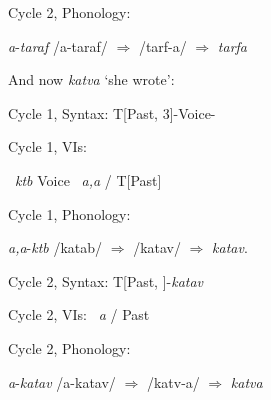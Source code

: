 \begin{exe}
\begin{xlist}
\begin{exe}
\begin{xlist}
\begin{exe}
\begin{xlist}
\begin{exe}
\begin{exe}
\begin{xlist}
\begin{exe}
\begin{xlist}
\begin{exe}
\begin{xlist}
\begin{exe}
\begin{xlist}
\begin{exe}
\begin{xlist}
\begin{exe}
\begin{xlist}
\begin{exe}
\begin{xlist}
\begin{exe}
\begin{xlist}
\begin{exe}
\begin{xlist}
\begin{exe}
\begin{xlist}
\begin{exe}
\begin{xlist}
\begin{exe}
\begin{xlist}
\begin{exe}
\begin{exe}
\begin{xlist}
\begin{exe}
\begin{xlist}
\begin{exe}
\begin{xlist}
\begin{exe}
\begin{xlist}
{\begin{exe}
\begin{xlist}
\begin{exe}
\begin{xlist}
\begin{exe}
\begin{xlist}
\begin{exe}
\begin{xlist}
\begin{xlist}
 \ex  Cycle 2, Phonology: 
 \begin{xlist} 
 	\ex   \emph{a}-\emph{taraf} 
 	\ex   /a-taraf/ $\Rightarrow$ /tarf-a/ $\Rightarrow$ \emph{tarfa} 
 \z
\z 

And now \emph{katva} `she wrote':
 \begin{exe}
\ex  Cycle 1, Syntax: 
	T[Past, 3]-Voice-

 \ex  Cycle 1, VIs: 
 \begin{xlist} 
 	\ex  {} \lra~\emph{ktb} 
 	\ex   Voice \lra~\emph{a,a} / T[Past] \trace 
 \z

 \ex  Cycle 1, Phonology: 
 \begin{xlist} 
 	\ex   \emph{a,a}-\emph{ktb} 
 	\ex  	/katab/ $\Rightarrow$ /katav/ $\Rightarrow$ \emph{katav}. 
 \z

\ex   Cycle 2, Syntax: 
	T[Past, ]-\emph{katav}

\ex   Cycle 2, VIs: 
	 \lra~\emph{a} / Past \trace

 \ex  Cycle 2, Phonology: 
 \begin{xlist} 
 	\ex   \emph{a}-\emph{katav} 
 	\ex   /a-katav/ $\Rightarrow$ /katv-a/ $\Rightarrow$ \emph{katva} 
 \z
\z 


\end{xlist}
\end{xlist}
\end{xlist}
\end{exe}
\end{xlist}
\end{xlist}
\end{xlist}
\end{exe}
\end{xlist}
\end{exe}
\end{xlist}
\end{exe}
\end{xlist}
\end{exe}}
\end{xlist}
\end{exe}
\end{xlist}
\end{exe}
\end{xlist}
\end{exe}
\end{xlist}
\end{exe}
\end{exe}
\end{xlist}
\end{exe}
\end{xlist}
\end{exe}
\end{xlist}
\end{exe}
\end{xlist}
\end{exe}
\end{xlist}
\end{exe}
\end{xlist}
\end{exe}
\end{xlist}
\end{exe}
\end{xlist}
\end{exe}
\end{xlist}
\end{exe}
\end{xlist}
\end{exe}
\end{xlist}
\end{exe}
\end{xlist}
\end{exe}
\end{exe}
\end{xlist}
\end{exe}
\end{xlist}
\end{exe}
\end{xlist}
\end{exe}

